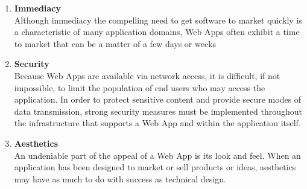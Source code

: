 \documentclass{article}
\begin{document}
\begin{enumerate}
		\item \textbf{Immediacy} \\
			Although immediacy the compelling need to get software to market quickly is a characteristic of many
				application domains, Web Apps often exhibit a time to market that can be a matter of a few days
				or weeks

		\item \textbf{Security} \\
			Because Web Apps are available via network access, it is difficult, if not impossible, to limit the
				population of end users who may access the application.
			In order to protect sensitive content and provide secure modes of data transmission, strong security
				measures must be implemented throughout the infrastructure that supports a Web App and within
				the application itself.

		\item \textbf{Aesthetics} \\
			An undeniable part of the appeal of a Web App is its look and feel.
			When an application has been designed to market or sell products or ideas, aesthetics may have as
			much to do with success as technical design.
	\end{enumerate} \newpage
\end{document}
